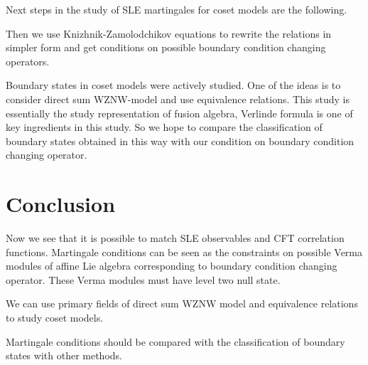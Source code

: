 \documentclass[a4paper]{jpconf}
\theoremstyle{definition}
\newcommand{\gf}{\mathfrak{g}}
\newcommand{\af}{\mathfrak{a}}
\theoremstyle{definition} \newtheorem{Def}{Definition}
\begin{document}
Next steps in the study of SLE martingales for coset models  are the following. 


Then we use Knizhnik-Zamolodchikov equations to rewrite the relations in simpler form and get conditions on possible boundary condition changing operators. 

Boundary states in coset models were actively studied. One of the ideas is to consider direct sum WZNW-model and use equivalence relations. This study is essentially the study representation of fusion algebra, Verlinde formula is one of key ingredients in this study. So we hope to compare the classification of boundary states obtained in this way with our condition on boundary condition changing operator. 

\section{Conclusion}
\label{sec:conclusion}

Now we see that it is possible to match SLE observables and CFT correlation functions. Martingale conditions can be seen as the constraints on possible Verma modules of affine Lie algebra corresponding to boundary condition changing operator. These Verma modules must have level two null state. 

We can use primary fields of direct sum WZNW model and equivalence relations to study coset models. 

Martingale conditions should be compared with the classification of boundary states with other methods.

{}

\end{document}
